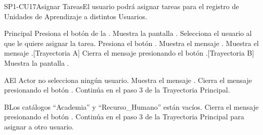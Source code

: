 
\begin{UseCase}{SP1-CU17}{Asignar Tareas}{El usuario podrá asignar tareas para el registro de Unidades de Aprendizaje a distintos Usuarios.}
\end{UseCase}

\begin{UCtrayectoria}{Principal}
    \UCpaso[\UCactor] Presiona el botón \BtnTask de la .
    \UCpaso Muestra la pantalla .
    \UCpaso[\UCactor] Selecciona el usuario al que le quiere asignar la tarea.
    \UCpaso[\UCactor] Presiona el botón .
    \UCpaso Muestra el mensaje .
    \UCpaso Muestra el mensaje .[Trayectoria A]
    \UCpaso[\UCactor] Cierra el mensaje presionando el botón .[Trayectoria B]
    \UCpaso Muestra la pantalla .
\end{UCtrayectoria}


\begin{UCtrayectoriaA}{A}{El Actor no selecciona ningún usuario.}
    \UCpaso Muestra el mensaje .
    \UCpaso[\UCactor] Cierra el mensaje presionando el botón .
    \UCpaso Continúa en el paso 3 de la Trayectoria Principal.
\end{UCtrayectoriaA}

\begin{UCtrayectoriaA}{B}{Los catálogos ``Academia'' y ``Recurso\_Humano'' están vacíos.}
    \UCpaso[\UCactor] Cierra el mensaje presionando el botón .
    \UCpaso Continúa en el paso 3 de la Trayectoria Principal para asignar a otro usuario.
\end{UCtrayectoriaA}